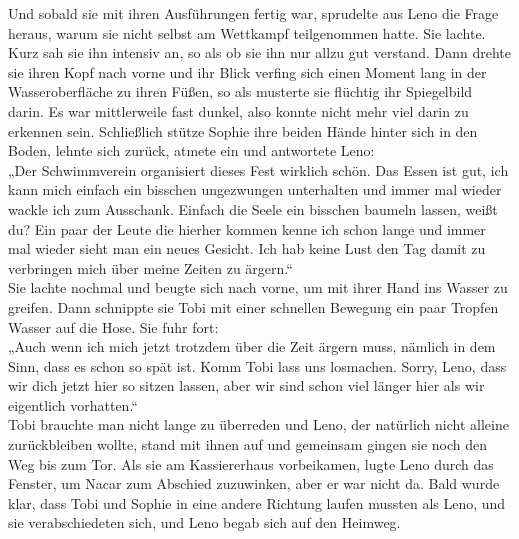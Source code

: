 \documentclass[ngerman,smalldemyvopaper,11pt,oneside,onecolumn,openright,extrafontsizes]{memoir}
\begin{document}
Und sobald sie mit ihren Ausführungen fertig war, sprudelte aus Leno die Frage heraus, warum sie nicht selbst am Wettkampf teilgenommen hatte. Sie lachte. Kurz sah sie ihn intensiv an, so als ob sie ihn nur allzu gut verstand. Dann drehte sie ihren Kopf nach vorne und ihr Blick verfing sich einen Moment lang in der Wasseroberfläche zu ihren Füßen, so als musterte sie flüchtig ihr Spiegelbild darin. Es war mittlerweile fast dunkel, also konnte nicht mehr viel darin zu erkennen sein. Schließlich stütze Sophie ihre beiden Hände hinter sich in den Boden, lehnte sich zurück, atmete ein und antwortete Leno:\\ „Der Schwimmverein organisiert dieses Fest wirklich schön. Das Essen ist gut, ich kann mich einfach ein bisschen ungezwungen unterhalten und immer mal wieder wackle ich zum Ausschank. Einfach die Seele ein bisschen baumeln lassen, weißt du? Ein paar der Leute die hierher kommen kenne ich schon lange und immer mal wieder sieht man ein neues Gesicht. Ich hab keine Lust den Tag damit zu verbringen mich über meine Zeiten zu ärgern.“
\vspace{0.5em} \\
Sie lachte nochmal und beugte sich nach vorne, um mit ihrer Hand ins Wasser zu greifen. Dann schnippte sie Tobi mit einer schnellen Bewegung ein paar Tropfen Wasser auf die Hose. Sie fuhr fort:\\
„Auch wenn ich mich jetzt trotzdem über die Zeit ärgern muss, nämlich in dem Sinn, dass es schon so spät ist. Komm Tobi lass uns losmachen. Sorry, Leno, dass wir dich jetzt hier so sitzen lassen, aber wir sind schon viel länger hier als wir eigentlich vorhatten.“
\vspace{0.5em} \\
Tobi brauchte man nicht lange zu überreden und Leno, der natürlich nicht alleine zurückbleiben wollte, stand mit ihnen auf und gemeinsam gingen sie noch den Weg bis zum Tor. Als sie am Kassiererhaus vorbeikamen, lugte Leno durch das Fenster, um Nacar zum Abschied zuzuwinken, aber er war nicht da. Bald wurde klar, dass Tobi und Sophie in eine andere Richtung laufen mussten als Leno, und sie verabschiedeten sich, und Leno begab sich auf den Heimweg.
\end{document}
